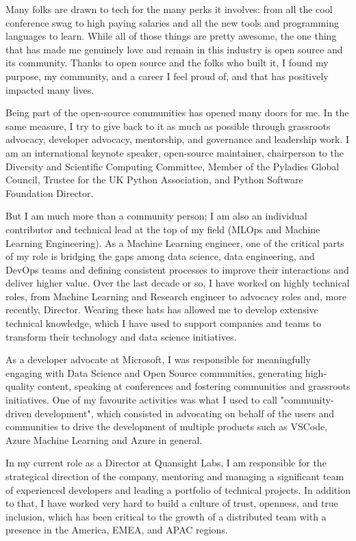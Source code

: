 Many folks are drawn to tech for the many perks it involves: from all the cool conference swag to high paying salaries and all the new tools and programming languages to learn.  While all of those things are pretty awesome, the one thing that has made me genuinely love and remain in this industry is open source and its community. Thanks to open source and the folks who built it, I found my purpose, my community, and a career I feel proud of, and that has positively impacted many lives. 

Being part of the open-source communities has opened many doors for me. In the same measure, I try to give back to it as much as possible through grassroots advocacy, developer advocacy, mentorship, and governance and leadership work. I am an international keynote speaker, open-source maintainer, chairperson to the Diversity and Scientific Computing Committee, Member of the Pyladies Global Council, Trustee for the UK Python Association, and Python Software Foundation Director. 

But I am much more than a community person; I am also an individual contributor and technical lead at the top of my field (MLOps and Machine Learning Engineering). As a Machine Learning engineer, one of the critical parts of my role is bridging the gaps among data science, data engineering, and DevOps teams and defining consistent processes to improve their interactions and deliver higher value. 
Over the last decade or so, I have worked on highly technical roles, from Machine Learning and Research engineer to advocacy roles and, more recently, Director. Wearing these hats has allowed me to develop extensive technical knowledge, which I have used to support companies and teams to transform their technology and data science initiatives.

As a developer advocate at Microsoft, I was responsible for meaningfully engaging with Data Science and Open Source communities, generating high-quality content, speaking at conferences and fostering communities and grassroots initiatives.  One of my favourite activities was what I used to call "community-driven development", which consisted in advocating on behalf of the users and communities to drive the development of multiple products such as VSCode, Azure Machine Learning and Azure in general.

In my current role as a Director at Quansight Labs, I am responsible for the strategical direction of the company, mentoring and managing a significant team of experienced developers and leading a portfolio of technical projects. In addition to that, I have worked very hard to build a culture of trust, openness, and true inclusion, which has been critical to the growth of a distributed team with a presence in the America, EMEA, and APAC regions. 

